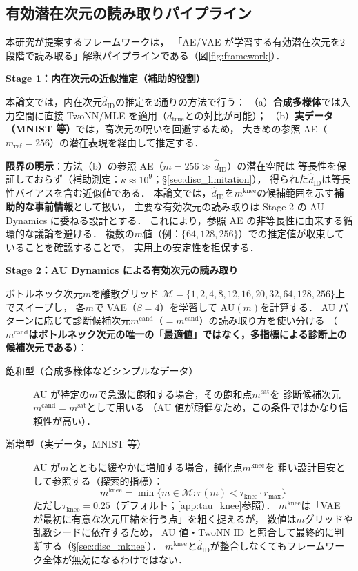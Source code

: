 \documentclass[11pt,a4paper]{jsarticle}
\newcommand{\dzopt}{m^{\mathrm{cand}}}
\newcommand{\dtrue}{d_{\mathrm{true}}}
\newcommand{\kap}{\kappa}
\newcommand{\dzsat}{m^{\mathrm{sat}}}
\newcommand{\mknee}{m^{\mathrm{knee}}}
\begin{document}
\subsection{有効潜在次元の読み取りパイプライン}\label{sec:framework_pipeline}

本研究が提案するフレームワークは，
「AE/VAE が学習する有効潜在次元を2段階で読み取る」解釈パイプラインである（図\ref{fig:framework}）．

\textbf{Stage 1：内在次元の近似推定（補助的役割）}

本論文では，内在次元$\hat{d}_\mathrm{ID}$の推定を2通りの方法で行う：
（a）\textbf{合成多様体}では入力空間に直接 TwoNN/MLE を適用（$\dtrue$との対比が可能）；
（b）\textbf{実データ（MNIST 等）}では，高次元の呪いを回避するため，
大きめの参照 AE（$m_{\mathrm{ref}} = 256$）の潜在表現を経由して推定する．

\textbf{限界の明示}：方法（b）の参照 AE（$m = 256 \gg \hat{d}_\mathrm{ID}$）の潜在空間は
等長性を保証しておらず（補助測定：$\kap \approx 10^9$；§\ref{sec:disc_limitation}），
得られた$\hat{d}_\mathrm{ID}$は等長性バイアスを含む近似値である．
本論文では，$\hat{d}_\mathrm{ID}$を$\mknee$の候補範囲を示す\textbf{補助的な事前情報}として扱い，
主要な有効次元の読み取りは Stage 2 の AU Dynamics に委ねる設計とする．
これにより，参照 AE の非等長性に由来する循環的な議論を避ける．
複数の$m$値（例：$\{64, 128, 256\}$）での推定値が収束していることを確認することで，
実用上の安定性を担保する．

\textbf{Stage 2：AU Dynamics による有効次元の読み取り}

ボトルネック次元$m$を離散グリッド
$\mathcal{M} = \{1, 2, 4, 8, 12, 16, 20, 32, 64, 128, 256\}$上でスイープし，
各$m$で VAE（$\beta = 4$）を学習して AU$(m)$を計算する．
AU パターンに応じて診断候補次元$\dzopt$（$= m^{\mathrm{cand}}$）の読み取り方を使い分ける
（\textbf{$\dzopt$はボトルネック次元の唯一の「最適値」ではなく，多指標による診断上の候補次元である}）：

\begin{description}
  \item[飽和型（合成多様体などシンプルなデータ）]
        AU が特定の$m$で急激に飽和する場合，その飽和点$\dzsat$を
        診断候補次元$\dzopt = \dzsat$として用いる
        （AU 値が頑健なため，この条件ではかなり信頼性が高い）．
  \item[漸増型（実データ，MNIST 等）]
        AU が$m$とともに緩やかに増加する場合，鈍化点$\mknee$を
        粗い設計目安として参照する（探索的指標）：
        \begin{equation}
          \mknee = \min\{m \in \mathcal{M} : r(m) < \tau_{\mathrm{knee}} \cdot r_{\max}\}
          \label{eq:mknee}
        \end{equation}
        ただし$\tau_{\mathrm{knee}} = 0.25$（デフォルト；\ref{app:tau_knee}参照）．
        $\mknee$は「VAE が最初に有意な次元圧縮を行う点」を粗く捉えるが，
        数値は$m$グリッドや乱数シードに依存するため，
        AU 値・TwoNN ID と照合して最終的に判断する（§\ref{sec:disc_mknee}）．
        $\mknee$と$\hat{d}_\mathrm{ID}$が整合しなくてもフレームワーク全体が無効になるわけではない．
\end{description}
\end{document}
